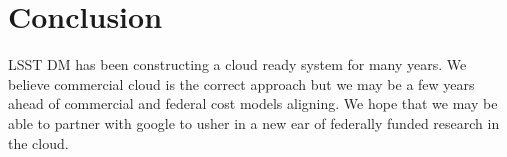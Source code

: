 
\section{Conclusion}

LSST \gls{DM} has been constructing a cloud ready system for many years. We believe commercial cloud is the correct approach but we may be a few years ahead of commercial and federal cost models aligning. We hope that we may be able to partner with google to usher in a new ear of federally funded research in the cloud.

~
